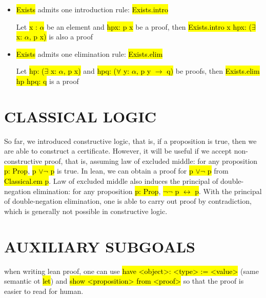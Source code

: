 \begin{itemize}
	\item \hl{Exists} admits one introduction rule: \hl{Exists.intro}
	
	Let \hl{x : $\alpha$} be an element and \hl{hpx: p x} be a proof, then \hl{Exists.intro x hpx: ($\exists$ x: $\alpha$, p x)} is also a proof
	
	\item \hl{Exists} admits one elimination rule: \hl{Exists.elim}
	
	Let \hl{hp: ($\exists$ x: $\alpha$, p x)} and \hl{hpq: ($\forall$ y: $\alpha$, p y $\to$ q)} be proofs, then \hl{Exists.elim hp hpq: q} is a proof 
\end{itemize}

\section{CLASSICAL LOGIC}

So far, we introduced constructive logic, that is, if a proposition is true, then we are able to construct a certificate. However, it will be useful if we accept non-constructive proof, that is, assuming law of excluded middle: for any proposition \hl{p: Prop}, \hl{p $\lor \lnot$ p} is true. In lean, we can obtain a proof for \hl{p $\lor \lnot$ p} from \hl{Classical.em p}. Law of excluded middle also induces the principal of double-negation elimination: for any proposition \hl{p: Prop}, \hl{$\lnot \lnot$ p $\leftrightarrow$ p}. With the principal of double-negation elimination, one is able to carry out proof by contradiction, which is generally not possible in constructive logic. 

\section{AUXILIARY SUBGOALS}


when writing lean proof, one can use \hl{have <object>: <type> := <value>} (same semantic ot \hl{let}) and \hl{show <proposition> from <proof>} so that the proof is easier to read for human.
